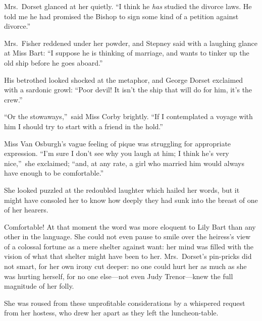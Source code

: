 \documentclass[12pt,a4paper]{book}
\begin{document}
Mrs.\ Dorset glanced at her quietly. ``I think he \textit{has} studied the
divorce laws. He told me he had promised the Bishop to sign some
kind of a petition against divorce.''





Mrs.\ Fisher reddened under her powder, and Stepney said with a
laughing glance at Miss Bart: ``I suppose he is thinking of
marriage, and wants to tinker up the old ship before he goes
aboard.''





His betrothed looked shocked at the metaphor, and George Dorset
exclaimed with a sardonic growl: ``Poor devil! It isn't the ship
that will do for him, it's the crew.''





``Or the stowaways,''\ said Miss Corby brightly. ``If I contemplated
a voyage with him I should try to start with a friend in the
hold.''





Miss Van Osburgh's vague feeling of pique was struggling for
appropriate expression. ``I'm sure I don't see why you laugh at
him; I think he's very nice,''\ she exclaimed; ``and, at any rate, a
girl who married him would always have enough to be comfortable.''





She looked puzzled at the redoubled laughter which hailed her
words, but it might have consoled her to know how deeply they had
sunk into the breast of one of her hearers.





Comfortable! At that moment the word was more eloquent to Lily
Bart than any other in the language. She could not even pause to
smile over the heiress's view of a colossal fortune as a mere
shelter against want: her mind was filled with the vision of what
that shelter might have been to her. Mrs.\ Dorset's pin-pricks did
not smart, for her own irony cut deeper: no one could hurt her as
much as she was hurting herself, for no one else---not even Judy
Trenor---knew the full magnitude of her folly.





She was roused from these unprofitable considerations by a
whispered request from her hostess, who drew her apart as they
left the luncheon-table.
\end{document}
